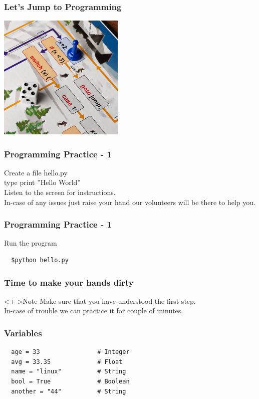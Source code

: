 \documentclass{beamer}
\begin{document}
\begin{frame}[fragile]
 \frametitle{Let's Jump to Programming}
 \begin{center}
  \includegraphics[height=6cm]{jump.jpg}
 \end{center}

\end{frame}

\begin{frame}[fragile]
 \frametitle{Programming Practice - 1}
 Create a file hello.py \\
 type \color{green} print \color{red}''Hello World'' \\
 \color{blue} Listen to the screen for instructions. \\
 In-case of any issues just raise your hand our volunteers will be there to help you.
\end{frame}

\begin{frame}[fragile]
 \frametitle{Programming Practice - 1}
 Run the program
 \begin{verbatim}
  $python hello.py
 \end{verbatim}

\end{frame}

\begin{frame}[fragile]
 \frametitle{Time to make your hands dirty}
 \begin{block}<+->{Note}
  Make sure that you have understood the first step.\\
  In-case of trouble we can practice it for couple of minutes.
 \end{block}
\end{frame}

\begin{frame}[fragile]
 \frametitle{Variables}
 \begin{verbatim}
  age = 33                # Integer
  avg = 33.35             # Float
  name = "linux"          # String
  bool = True             # Boolean
  another = "44"          # String
 \end{verbatim}

\end{frame}
\end{document}

